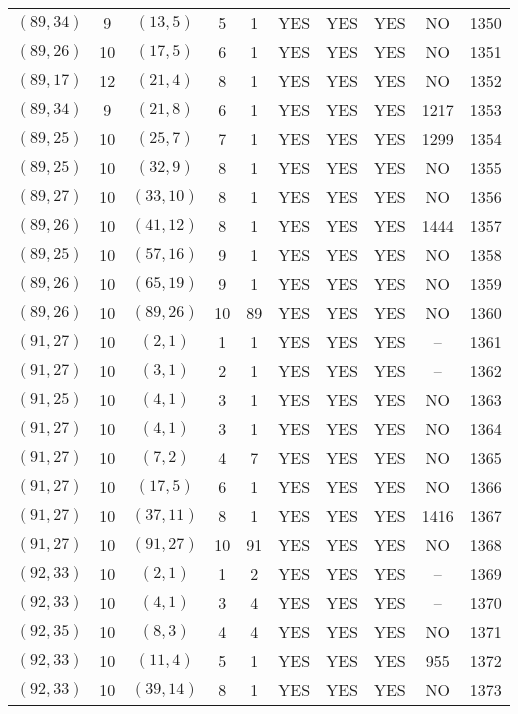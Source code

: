 \begin{longtable}{|c|c|c|c|c|c|c|c|c|c|}
$(89, 34)$ & 9 & $(13, 5)$ & 5 & 1 & YES & YES & YES & NO & 1350\\
$(89, 26)$ & 10 & $(17, 5)$ & 6 & 1 & YES & YES & YES & NO & 1351\\
$(89, 17)$ & 12 & $(21, 4)$ & 8 & 1 & YES & YES & YES & NO & 1352\\
$(89, 34)$ & 9 & $(21, 8)$ & 6 & 1 & YES & YES & YES & 1217 & 1353\\
$(89, 25)$ & 10 & $(25, 7)$ & 7 & 1 & YES & YES & YES & 1299 & 1354\\
$(89, 25)$ & 10 & $(32, 9)$ & 8 & 1 & YES & YES & YES & NO & 1355\\
$(89, 27)$ & 10 & $(33, 10)$ & 8 & 1 & YES & YES & YES & NO & 1356\\
$(89, 26)$ & 10 & $(41, 12)$ & 8 & 1 & YES & YES & YES & 1444 & 1357\\
$(89, 25)$ & 10 & $(57, 16)$ & 9 & 1 & YES & YES & YES & NO & 1358\\
$(89, 26)$ & 10 & $(65, 19)$ & 9 & 1 & YES & YES & YES & NO & 1359\\
$(89, 26)$ & 10 & $(89, 26)$ & 10 & 89 & YES & YES & YES & NO & 1360\\
$(91, 27)$ & 10 & $(2, 1)$ & 1 & 1 & YES & YES & YES & -- & 1361\\
$(91, 27)$ & 10 & $(3, 1)$ & 2 & 1 & YES & YES & YES & -- & 1362\\
$(91, 25)$ & 10 & $(4, 1)$ & 3 & 1 & YES & YES & YES & NO & 1363\\
$(91, 27)$ & 10 & $(4, 1)$ & 3 & 1 & YES & YES & YES & NO & 1364\\
$(91, 27)$ & 10 & $(7, 2)$ & 4 & 7 & YES & YES & YES & NO & 1365\\
$(91, 27)$ & 10 & $(17, 5)$ & 6 & 1 & YES & YES & YES & NO & 1366\\
$(91, 27)$ & 10 & $(37, 11)$ & 8 & 1 & YES & YES & YES & 1416 & 1367\\
$(91, 27)$ & 10 & $(91, 27)$ & 10 & 91 & YES & YES & YES & NO & 1368\\
$(92, 33)$ & 10 & $(2, 1)$ & 1 & 2 & YES & YES & YES & -- & 1369\\
$(92, 33)$ & 10 & $(4, 1)$ & 3 & 4 & YES & YES & YES & -- & 1370\\
$(92, 35)$ & 10 & $(8, 3)$ & 4 & 4 & YES & YES & YES & NO & 1371\\
$(92, 33)$ & 10 & $(11, 4)$ & 5 & 1 & YES & YES & YES & 955 & 1372\\
$(92, 33)$ & 10 & $(39, 14)$ & 8 & 1 & YES & YES & YES & NO & 1373\\

\end{longtable}
